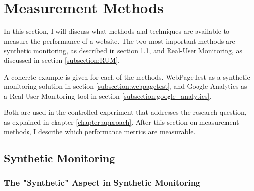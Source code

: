 





\section{Measurement Methods}
\label{section:measurement_methods}

In this section, I will discuss what methods and techniques are available to measure the performance of a website.
The two most important methods are synthetic monitoring, as described in section \ref{subsection:synthetic_monitoring}, and Real-User Monitoring, as discussed in section \ref{subsection:RUM}.

A concrete example is given for each of the methods.
WebPageTest as a synthetic monitoring solution in section \ref{subsection:webpagetest},
and Google Analytics as a Real-User Monitoring tool in section \ref{subsection:google_analytics}.

Both are used in the controlled experiment that addresses the research question, as explained in chapter \ref{chapter:approach}.
After this section on measurement methods, I describe which performance metrics are measurable.




\subsection{Synthetic Monitoring}
\label{subsection:synthetic_monitoring}


\subsubsection{The "Synthetic" Aspect in Synthetic Monitoring} %

